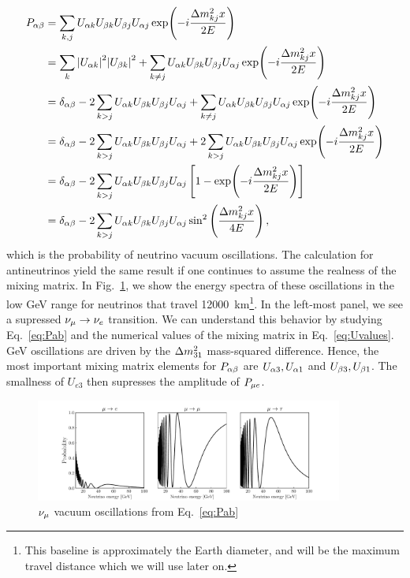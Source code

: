 \begin{align}\label{eq:Pab}%
    P_{\ab} &= \sum_{k,j} U_{\a k}U_{\b k}U_{\b j}U_{\a j} \exp(-i\frac{\dm_{kj}x}{2E}) \nonumber \\
            &=  \sum_k \abs{U_{\a k}}^2\abs{U_{\b k}}^2 + \sum_{k \neq j} U_{\a k}U_{\b k}U_{\b j}U_{\a j} \exp(-i\frac{\dm_{kj}x}{2E}) \nonumber \\
            &= \delta_{\a \b} - 2 \sum_{k>j}U_{\a k} U_{\b k} U_{\b j} U_{\a j} +\sum_{k \neq j} U_{\a k}U_{\b k}U_{\b j}U_{\a j} \exp(-i\frac{\dm_{kj}x}{2E}) \nonumber \\
            &= \delta_{\a \b} - 2 \sum_{k>j}U_{\a k} U_{\b k} U_{\b j} U_{\a j} + 2\sum_{k > j} U_{\a k}U_{\b k}U_{\b j}U_{\a j} \exp(-i\frac{\dm_{kj}x}{2E}) \nonumber \\
            &= \delta_{\a \b} - 2\sum_{k > j} U_{\a k}U_{\b k}U_{\b j}U_{\a j} \left[1-\exp(-i\frac{\dm_{kj}x}{2E})\right] \nonumber \\
            &= \delta_{\a \b} - 2\sum_{k > j} U_{\a k}U_{\b k}U_{\b j}U_{\a j} \sin^2{\left(\frac{\dm_{kj}x}{4E}\right)}\,,
\end{align}
which is the probability of neutrino vacuum oscillations.
The calculation for antineutrinos yield the same result if one continues to assume the realness of the mixing matrix. 
In Fig.~\ref{fig:vac_osc}, we show the energy spectra of these oscillations in the low \si{\GeV} range for neutrinos that travel \SI{12000}{\km}\footnote{This baseline
is approximately the Earth diameter, and will be the maximum travel distance which we will use later on.}.
In the left-most panel, we see a supressed $\nu_\mu \to \nu_e$ transition. We can understand this behavior by studying Eq.~\ref{eq:Pab} and the 
numerical values of the mixing matrix in Eq.~\ref{eq:Uvalues}.
\si{\GeV} oscillations are driven by the $\dm[31]$ mass-squared difference. Hence, the most important mixing matrix 
elements for $P_{\alpha\beta}$ are $U_{\alpha3}, U_{\alpha1}$ and $U_{\beta3}, U_{\beta1}$. The smallness of $U_{e3}$ then supresses the
amplitude of $P_{\mu e}$.
\begin{figure}
    \centering
    \includegraphics[width=0.9\textwidth]{figures/vac_osc.pdf}
    \caption{$\nu_\mu$ vacuum oscillations from Eq.~\ref{eq:Pab}}\label{fig:vac_osc}
\end{figure}

